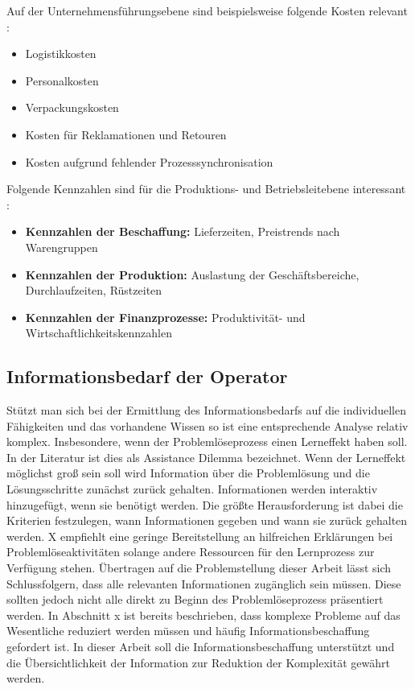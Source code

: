 Auf der Unternehmensführungsebene sind beispielsweise folgende Kosten relevant  \cite{Kunstler2014}:
\begin{itemize}
\item Logistikkosten
\item Personalkosten
\item Verpackungskosten
\item Kosten für Reklamationen und Retouren
\item Kosten aufgrund fehlender Prozesssynchronisation
\end{itemize}
Folgende Kennzahlen sind für die Produktions- und Betriebsleitebene interessant \cite{Kunstler2014}:
\begin{itemize}
\item \textbf{Kennzahlen der Beschaffung:} Lieferzeiten, Preistrends nach Warengruppen
\item \textbf{Kennzahlen der Produktion:} Auslastung der Geschäftsbereiche, Durchlaufzeiten, Rüstzeiten
\item \textbf{Kennzahlen der Finanzprozesse:} Produktivität- und Wirtschaftlichkeitskennzahlen
\end{itemize}

\subsection{Informationsbedarf der Operator}
Stützt man sich bei der Ermittlung des Informationsbedarfs auf die individuellen Fähigkeiten und das vorhandene Wissen so ist eine entsprechende Analyse relativ komplex. Insbesondere, wenn der Problemlöseprozess einen Lerneffekt haben soll. In der Literatur ist dies als Assistance Dilemma bezeichnet. Wenn der Lerneffekt möglichst groß sein soll wird Information über die Problemlösung und die Lösungsschritte zunächst zurück gehalten. Informationen werden interaktiv hinzugefügt, wenn sie benötigt werden. Die größte Herausforderung ist dabei die Kriterien festzulegen, wann Informationen gegeben und wann sie zurück gehalten werden. \cite{}  X empfiehlt eine geringe Bereitstellung an hilfreichen Erklärungen bei Problemlöseaktivitäten solange andere Ressourcen für den Lernprozess zur Verfügung stehen. Übertragen auf die Problemstellung dieser Arbeit lässt sich Schlussfolgern, dass alle relevanten Informationen zugänglich sein müssen. Diese sollten jedoch nicht alle direkt zu Beginn des Problemlöseprozess präsentiert werden. In Abschnitt x ist bereits beschrieben, dass komplexe Probleme auf das Wesentliche reduziert werden müssen und häufig Informationsbeschaffung gefordert ist. In dieser Arbeit soll die Informationsbeschaffung unterstützt und die Übersichtlichkeit der Information zur Reduktion der Komplexität gewährt werden.

